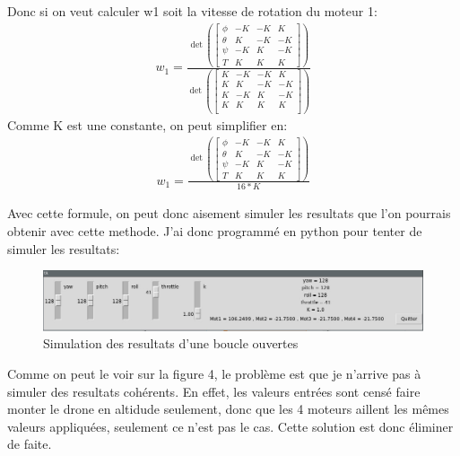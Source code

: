 \documentclass[10pt,a4paper]{article}
\begin{document}
Donc si on veut calculer w1 soit la vitesse de rotation du moteur 1:\\
\begin{equation}\label{xx}
\begin{split}
w_1 =\frac{ \det(\begin{bmatrix}
            \phi & -K & -K & K\\
            \theta & K & -K & -K\\
            \psi & -K & K & -K\\
            T & K & K & K
          \end{bmatrix})}{\det(\begin{bmatrix}
                K & -K & -K & K \\
                K & K & -K & -K \\
                K & -K & K & -K \\
                K & K & K & K \\
          \end{bmatrix})}
\end{split}
\end{equation}
Comme K est une constante, on peut simplifier en:
\begin{equation}\label{xx}
\begin{split}
w_1 =\frac{ \det(\begin{bmatrix}
            \phi & -K & -K & K\\
            \theta & K & -K & -K\\
            \psi & -K & K & -K\\
            T & K & K & K
          \end{bmatrix})}{16 * K}
\end{split}
\end{equation}


Avec cette formule, on peut donc aisement simuler les resultats que l'on pourrais obtenir avec cette methode. J'ai donc programmé en python pour tenter de simuler les resultats: 

  \begin{figure}[h!]
\centering
\includegraphics[scale=0.250]{image/SimOpenLoop.jpg}
\caption{Simulation des resultats d'une boucle ouvertes}
\label{fig:net }
\end{figure}
 Comme on peut le voir sur la figure 4, le problème est que je n'arrive pas à simuler des resultats cohérents. En effet, les valeurs entrées sont censé faire monter le drone en altidude seulement, donc que les 4 moteurs aillent les mêmes valeurs appliquées, seulement ce n'est pas le cas. Cette solution est donc éliminer de faite.
 
\end{document}
